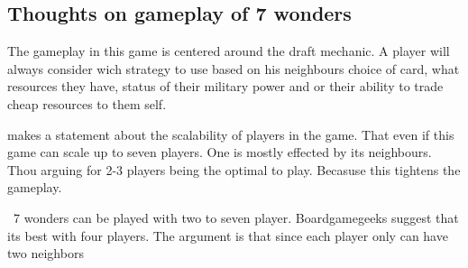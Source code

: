 \documentclass[a4paper]{article}
\begin{document}
\subsection{Thoughts on gameplay of 7 wonders}
The gameplay in this game is centered around the draft mechanic. A player will always consider wich strategy to use based on his neighbours choice of card, what resources they have, status of their military power and or their ability to trade cheap resources to them self. 

\citeauthor{critical7wond} makes a statement about the scalability of players in the game. That even if this game can scale up to seven players. One is mostly effected by its neighbours. Thou arguing for 2-3 players being the optimal to play. Becasuse this tightens the gameplay. 

\
7 wonders can be played with two to seven player. Boardgamegeeks suggest that its best with four players. The argument is that since each player only can have two neighbors  
\end{document}
